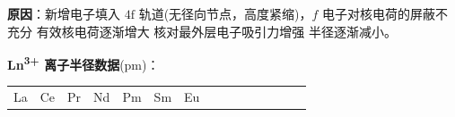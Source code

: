 \textbf{原因}：新增电子填入 \(4\mathrm{f}\) 轨道(无径向节点，高度紧缩)，\(f\) 电子对核电荷的屏蔽不充分 \箭 有效核电荷逐渐增大 \箭 核对最外层电子吸引力增强 \箭 半径逐渐减小。

\textbf{Ln\textsuperscript{3+} 离子半径数据}(pm)：

{\def\LTcaptype{none} %
\begin{longtable}[]{@{}
  >{\centering\arraybackslash}p{}
  >{\centering\arraybackslash}p{}
  >{\centering\arraybackslash}p{}
  >{\centering\arraybackslash}p{}
  >{\centering\arraybackslash}p{}
  >{\centering\arraybackslash}p{}
  >{\centering\arraybackslash}p{}
  >{\centering\arraybackslash}p{}
  >{\centering\arraybackslash}p{}
  >{\centering\arraybackslash}p{}
  >{\centering\arraybackslash}p{}
  >{\centering\arraybackslash}p{}
  >{\centering\arraybackslash}p{}
  >{\centering\arraybackslash}p{}
  >{\centering\arraybackslash}p{}@{}}
\toprule\noalign{}
\begin{minipage}[b]{\linewidth}\centering
La
\end{minipage} & \begin{minipage}[b]{\linewidth}\centering
Ce
\end{minipage} & \begin{minipage}[b]{\linewidth}\centering
Pr
\end{minipage} & \begin{minipage}[b]{\linewidth}\centering
Nd
\end{minipage} & \begin{minipage}[b]{\linewidth}\centering
Pm
\end{minipage} & \begin{minipage}[b]{\linewidth}\centering
Sm
\end{minipage} & \begin{minipage}[b]{\linewidth}\centering
Eu
\end{minipage} & \begin{minipage}[b]{\linewidth}\centering

\end{minipage}
\end{longtable}}
